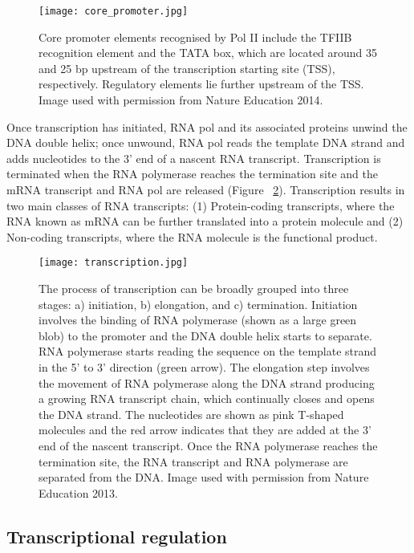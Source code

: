 \begin{figure}[!ht]
   \centering
   \texttt{[image: core\_promoter.jpg]}
   \caption[Core promoter elements]{Core promoter elements recognised by Pol II include the TFIIB recognition element and the TATA box, which are located around 35 and 25 bp upstream of the transcription starting site (TSS), respectively. Regulatory elements lie further upstream of the TSS. Image used with permission from Nature Education 2014.}
   \label{fig:core_promoter}
\end{figure}

Once transcription has initiated, RNA pol and its associated proteins unwind the DNA double helix; once unwound, RNA pol reads the template DNA strand and adds nucleotides to the 3' end of a nascent RNA transcript. Transcription is terminated when the RNA polymerase reaches the termination site and the mRNA transcript and RNA pol are released (Figure ~\ref{fig:transcription}). Transcription results in two main classes of RNA transcripts: (1) Protein-coding transcripts, where the RNA known as mRNA can be further translated into a protein molecule and (2) Non-coding transcripts, where the RNA molecule is the functional product.

\begin{figure}[!ht]
   \centering
   \texttt{[image: transcription.jpg]}
   \caption[DNA transcription]{The process of transcription can be broadly grouped into three stages: a) initiation, b) elongation, and c) termination. Initiation involves the binding of RNA polymerase (shown as a large green blob) to the promoter and the DNA double helix starts to separate. RNA polymerase starts reading the sequence on the template strand in the 5' to 3' direction (green arrow). The elongation step involves the movement of RNA polymerase along the DNA strand producing a growing RNA transcript chain, which continually closes and opens the DNA strand. The nucleotides are shown as pink T-shaped molecules and the red arrow indicates that they are added at the 3' end of the nascent transcript. Once the RNA polymerase reaches the termination site, the RNA transcript and RNA polymerase are separated from the DNA. Image used with permission from Nature Education 2013.}
   \label{fig:transcription}
\end{figure}

\subsection{Transcriptional regulation}

